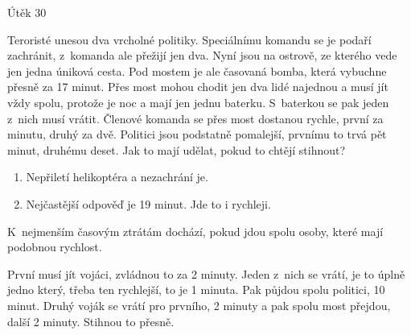 Útěk
30 %

Teroristé unesou dva vrcholné politiky. Speciálnímu komandu se je podaří zachránit, z~komanda ale přežijí jen dva. Nyní jsou na ostrově, ze kterého vede jen jedna úniková cesta. Pod mostem je ale časovaná bomba, která vybuchne přesně za 17 minut. Přes most mohou chodit jen dva lidé najednou a musí jít vždy spolu, protože je noc a mají jen jednu baterku. S~baterkou se pak jeden z~nich musí vrátit. Členové komanda se přes most dostanou rychle, první za minutu, druhý za dvě. Politici jsou podstatně pomalejší, prvnímu to trvá pět minut, druhému deset. Jak to mají udělat, pokud to chtějí stihnout?

\begin{enumerate}
\item Nepřiletí helikoptéra a nezachrání je.
\item Nejčastější odpověď je 19 minut. Jde to i rychleji.
\end{enumerate}

K~nejmenším časovým ztrátám dochází, pokud jdou spolu osoby, které mají podobnou rychlost.

První musí jít vojáci, zvládnou to za 2 minuty. Jeden z~nich se vrátí, je to úplně jedno který, třeba ten rychlejší, to je 1 minuta. Pak půjdou spolu politici, 10 minut. Druhý voják se vrátí pro prvního, 2 minuty a pak spolu most přejdou, další 2 minuty. Stihnou to přesně.
